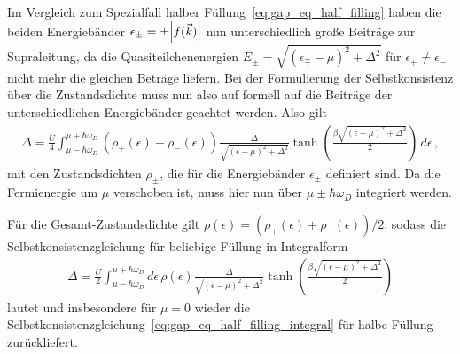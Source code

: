 Im Vergleich zum Spezialfall halber Füllung~\eqref{eq:gap_eq_half_filling} haben die beiden Energiebänder $\epsilon_\pm = \pm \abs{f({\vec{k}})}$ nun unterschiedlich große Beiträge zur Supraleitung, da die Quasiteilchenenergien $E_\pm = \sqrt{(\epsilon_{\mp} - \mu)^2 + \Delta^2}$ für $\epsilon_+ \neq \epsilon_-$ nicht mehr die gleichen Beträge liefern.
Bei der Formulierung der Selbstkonsistenz über die Zustandsdichte muss nun also auf formell auf die Beiträge der unterschiedlichen Energiebänder geachtet werden.
Also gilt 
\begin{align}
    \Delta = \frac{U}{4} \int_{\mu -\hbar \omega_D}^{\mu + \hbar \omega_D} \left(\rho_{+}(\epsilon) + \rho_{-}(\epsilon)\right) \frac{\Delta}{\sqrt{(\epsilon - \mu)^2 + \Delta^2}} \tanh\left(\frac{\beta \sqrt{(\epsilon - \mu)^2 + \Delta^2}}{2}\right) \, d\epsilon \, ,
\end{align}
mit den Zustandsdichten $\rho_\pm$, die für die Energiebänder $\epsilon_\pm$ definiert sind.
Da die Fermienergie um $\mu$ verschoben ist, muss hier nun über $\mu \pm \hbar \omega_D$ integriert werden.

Für die Gesamt-Zustandsdichte gilt $\rho(\epsilon) = (\rho_{+}(\epsilon) + \rho_{-}(\epsilon))/2$, sodass die Selbstkonsistenzgleichung für beliebige Füllung in Integralform
\begin{align}
    \Delta = \frac{U}{2} \int_{\mu -\hbar \omega_D}^{\mu + \hbar \omega_D} d\epsilon \, \rho(\epsilon) \frac{\Delta}{\sqrt{(\epsilon - \mu)^2 + \Delta^2}} \tanh\left(\frac{\beta \sqrt{(\epsilon - \mu)^2 + \Delta^2}}{2}\right) \label{eq:gap_eq_arbitrary_filling_integral}
\end{align}
lautet und insbesondere für $\mu = 0$ wieder die Selbstkonsistenzgleichung~\eqref{eq:gap_eq_half_filling_integral} für halbe Füllung zurückliefert. 